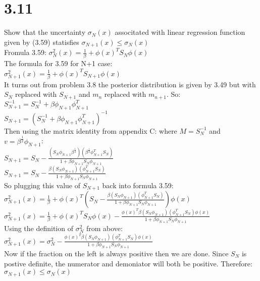 \documentclass[11pt,leqno,fleqn]{article}
\begin{document}
\newpage
\section{3.11}
Show that the uncertainty $\sigma _N(x)$ associtated with linear regression function given by (3.59) statisfies $\sigma _{N+1}(x) \leq \sigma_N(x) $\\
Fromula 3.59:
$\sigma_{N}^2(x) = \frac{1}{\beta} + \phi(x)^T S_{N} \phi(x)$\\
The formula for 3.59 for N+1 case:\\
$\sigma_{N+1}^2(x) = \frac{1}{\beta} + \phi(x)^T S_{N+1} \phi(x)$\\
It turns out from problem 3.8 the posterior distribution is given by 3.49 but with $S_N$ replaced with $S_{N+1}$ and $m_n$ replaced with $m_{n+1}$. So:\\
$S_{N+1}^{-1} =  S_N^{-1} + \beta \phi_{N+1} \phi_{N+1}^T$\\
$S_{N+1} =  (S_N^{-1} + \beta \phi_{N+1} \phi_{N+1}^T)^{-1}$\\
Then using the matrix identity from appendix C: where $M = S_N^{-1}$ and $v = \beta^{\frac{1}{2}} \phi_{N+1}$:\\
$S_{N+1} = S_N - \frac{(S_N \phi_{N+1} \beta^{\frac{1}{2}})(\beta^{\frac{1}{2}} \phi_{N+1}^T S_N)}{1 + \beta \phi_{N+1} S_N \phi_{N+1}}$\\
$S_{N+1} = S_N - \frac{\beta (S_N \phi_{N+1} )( \phi_{N+1}^T S_N)}{1 + \beta \phi_{N+1} S_N \phi_{N+1}}$\\
So plugging this value of $S_{N+1}$ back into formula 3.59:\\
$\sigma_{N+1}^2(x) = \frac{1}{\beta} + \phi(x)^T ( S_N - \frac{\beta (S_N \phi_{N+1} )( \phi_{N+1}^T S_N)}{1 + \beta \phi_{N+1} S_N \phi_{N+1}}) \phi(x)$\\
$\sigma_{N+1}^2(x) = \frac{1}{\beta} + \phi(x)^T S_N \phi(x)   - \frac{\phi(x)^T \beta (S_N \phi_{N+1} )( \phi_{N+1}^T S_N)\phi(x)}{1 + \beta \phi_{N+1} S_N \phi_{N+1}}$\\
Using the definition of $\sigma_N^2$ from above:\\
$\sigma_{N+1}^2(x) = \sigma_N^2    - \frac{\phi(x)^T \beta (S_N \phi_{N+1} )( \phi_{N+1}^T S_N)\phi(x)}{1 + \beta \phi_{N+1} S_N \phi_{N+1}}$\\
Now if the fraction on the left is always positive then we are done.  Since $S_N$ is postive definite, the numerator and demoniator will both be positive. Therefore:\\
$\sigma _{N+1}(x) \leq \sigma_N(x) $\\
\end{document}
